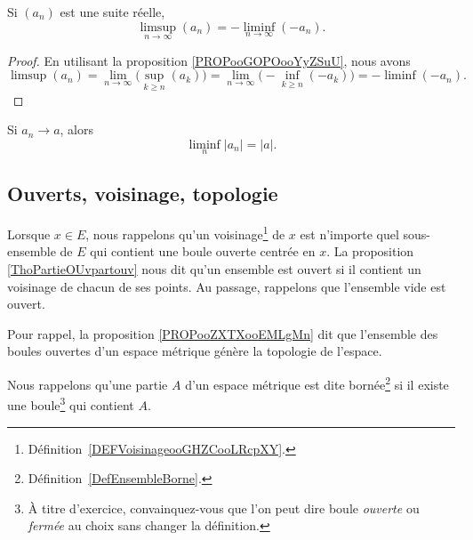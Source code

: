 \begin{lemma}       \label{LEMooMTRDooBMxFmn}
	Si \( (a_n)\) est une suite réelle,
	\begin{equation}
		\limsup_{n\to\infty}(a_n)=-\liminf_{n\to\infty}(-a_n).
	\end{equation}
\end{lemma}

\begin{proof}
	En utilisant la proposition \ref{PROPooGOPOooYyZSuU}, nous avons
	\begin{equation}
		\limsup(a_n)=\lim_{n\to\infty}\Big( \sup_{k\geq n}(a_k) \Big)=\lim_{n\to \infty} \Big( -\inf_{k\geq n}(-a_k) \Big)=-\liminf(-a_n).
	\end{equation}
\end{proof}

\begin{proposition}	\label{PROPooUOYTooGwGZHz}
	Si \( a_n\to a\), alors
	\begin{equation}
		\liminf_n| a_n |=| a |.
	\end{equation}
\end{proposition}

\subsection{Ouverts, voisinage, topologie}

Lorsque \( x\in E\), nous rappelons qu'un voisinage\footnote{Définition~\ref{DEFVoisinageooGHZCooLRcpXY}.} de \( x\) est n'importe quel sous-ensemble de \( E\) qui contient une boule ouverte centrée en \( x\). La proposition \ref{ThoPartieOUvpartouv} nous dit qu'un ensemble est ouvert si il contient un voisinage de chacun de ses points. Au passage, rappelons que l'ensemble vide est ouvert.

Pour rappel, la proposition \ref{PROPooZXTXooEMLgMn} dit que l'ensemble des boules ouvertes d'un espace métrique génère la topologie de l'espace.

Nous rappelons qu'une partie \( A\) d'un espace métrique est dite bornée\footnote{Définition~\ref{DefEnsembleBorne}.} si il existe une boule\footnote{À titre d'exercice, convainquez-vous que l'on peut dire boule \emph{ouverte} ou \emph{fermée} au choix sans changer la définition.} qui contient \( A\).

